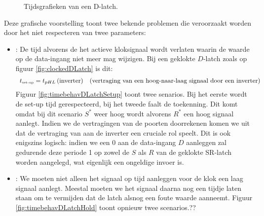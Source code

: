 \begin{figure}[hbt]
{
\label{fig:timebehavDLatchHold}
}
\caption{Tijdsgrafieken van een D-latch.}
\label{fig:timebehavDLatch}
\end{figure}
Deze grafische voorstelling toont twee bekende problemen die veroorzaakt worden door het niet respecteren van twee parameters:
\begin{itemize}
 \item {}: De tijd alvorens de het actieve kloksignaal wordt verlaten waarin de waarde op de data-ingang niet meer mag wijzigen. Bij een geklokte $D$-latch zoals op figuur \ref{fig:clockedDLatch} is dit:
\begin{equation}
\begin{array}{cr}
t_{\mbox{\tiny{set-up}}}=t_{pHL}\left(\mbox{inverter}\right)&\mbox{(vertraging van een hoog-naar-laag signaal door een inverter)}
\end{array}
\end{equation}
Figuur \ref{fig:timebehavDLatchSetup} toont twee senarios. Bij het eerste wordt de set-up tijd gerespecteerd, bij het tweede faalt de toekenning. Dit komt omdat bij dit scenario $S^*$ weer hoog wordt alvorens $R^*$ een hoog signaal aanlegt. Indien we de vertragingen van de poorten doorrekenen komen we uit dat de vertraging van aan de inverter een cruciale rol speelt. Dit is ook enigszins logisch: indien we een 0 aan de data-ingang $D$ aanleggen zal gedurende deze periode 1 op zowel de $S$ als $R$ van de geklokte SR-latch worden aangelegd, wat eigenlijk een ongeldige invoer is.
 \item {}: We moeten niet alleen het signaal op tijd aanleggen voor de klok een laag signaal aanlegt. Meestal moeten we het signaal daarna nog een tijdje laten staan om te vermijden dat de latch alsnog een foute waarde aanneemt. Figuur \ref{fig:timebehavDLatchHold} toont opnieuw twee scenarios.??%
\end{itemize}
